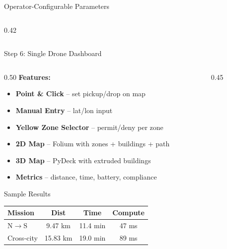 \documentclass[aspectratio=169, 11pt]{beamer}
\begin{document}
\begin{frame}{Operator-Configurable Parameters}
\begin{columns}[T]
\begin{column}{0.42\textwidth}
\end{column}
\end{columns}
\end{frame}

\begin{frame}{Step 6: Single Drone Dashboard}
\begin{columns}[T]
\begin{column}{0.50\textwidth}
\textcolor{neongreen}{\textbf{Features:}}
\begin{itemize}\small
    \item[\textcolor{neongreen}{$\bullet$}] \textbf{Point \& Click} -- set pickup/drop on map
    \item[\textcolor{neongreen}{$\bullet$}] \textbf{Manual Entry} -- lat/lon input
    \item[\textcolor{neongreen}{$\bullet$}] \textbf{Yellow Zone Selector} -- permit/deny per zone
    \item[\textcolor{neongreen}{$\bullet$}] \textbf{2D Map} -- Folium with zones + buildings + path
    \item[\textcolor{neongreen}{$\bullet$}] \textbf{3D Map} -- PyDeck with extruded buildings
    \item[\textcolor{neongreen}{$\bullet$}] \textbf{Metrics} -- distance, time, battery, compliance
\end{itemize}

\vspace{0.3cm}
\begin{exampleblock}{Sample Results}
\footnotesize
\begin{tabular}{@{}lccc@{}}
\toprule
\textbf{Mission} & \textbf{Dist} & \textbf{Time} & \textbf{Compute} \\
\midrule
N$\to$S & 9.47 km & 11.4 min & 47 ms \\
Cross-city & 15.83 km & 19.0 min & 89 ms \\
\bottomrule
\end{tabular}
\end{exampleblock}
\end{column}
\begin{column}{0.45\textwidth}
\end{column}
\end{columns}
\end{frame}
\end{document}
